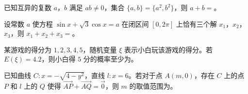 \begin{question}
已知互异的复数 $a$，$b$ 满足 $ab\neq0$，集合 $\{a,b\}=\{a^2,b^2\}$，则 $a+b=$\gkblank{}。

\end{question}
\begin{question}
设常数 $a$ 使方程 $\sin x+\sqrt3\cos x=a$ 在闭区间 $[0,2\pi]$ 上恰有三个解 $x_1$，$x_2$，$x_3$，则 $x_1+x_2+x_3=$\gkblank{}。

\end{question}
\begin{question}
某游戏的得分为 $1,2,3,4,5$，随机变量 $\xi$ 表示小白玩该游戏的得分。若 $E(\xi)=4.2$，则小白得 $5$ 分的概率至少为\gkblank{}。

\end{question}
\begin{question}
已知曲线 $C:x=-\sqrt{4-y^2}$，直线 $l:x=6$。若对于点 $A(m,0)$，存在 $C$ 上的点 $P$ 和 $l$ 上的 $Q$ 使得 $\overrightarrow{AP}+\overrightarrow{AQ}=\vec{0}$，则 $m$ 的取值范围为\gkblank{}。

\end{question}

